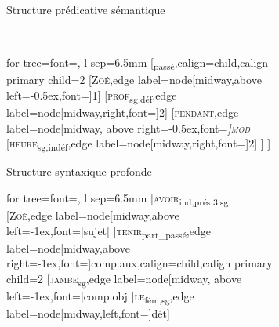 \begin{figure}[ph]
\begin{subfigure}[h]{0.66\textwidth}
		\caption{Structure prédicative sémantique}
	\end{subfigure}%
	\bigskip\medskip\\%
	\begin{subfigure}[b]{0.5\textwidth}\centering
		\begin{forest} for tree={font=\normalfont, l sep=6.5mm}
			[\textsubscript{passé},calign=child,calign primary child=2
				[\textsc{Zoé},edge label={node[midway,above left=-0.5ex,font=\footnotesize]{1}}]
				[\textsc{prof}\textsubscript{sg,déf},edge label={node[midway,right,font=\footnotesize]{2}}]
				[\textsc{pendant},edge label={node[midway, above right=-0.5ex,font=\footnotesize\itshape]{\textsc{mod}}}
					[\textsc{heure}\textsubscript{sg,indéf},edge label={node[midway,right,font=\footnotesize]{2}}]
				]
			]
		\end{forest}
		\caption{Structure syntaxique profonde}
	\end{subfigure}%
	\hfill
	\begin{subfigure}[b]{0.5\textwidth}\centering
		\begin{forest} for tree={font=\normalfont, l sep=6.5mm}
			[\textsc{avoir}\textsubscript{ind,prés,3,sg}
				[\textsc{Zoé},edge label={node[midway,above left=-1ex,font=\footnotesize]{sujet}}]
				[\textsc{tenir}\textsubscript{part\_passé},edge label={node[midway,above right=-1ex,font=\footnotesize]{comp{\NoAutoSpacing :}aux}},calign=child,calign primary child=2
					[\textsc{jambe}\textsubscript{sg},edge label={node[midway, above left=-1ex,font=\footnotesize]{comp{\NoAutoSpacing :}obj}}
						[\textsc{le}\textsubscript{fém,sg},edge label={node[midway,left,font=\footnotesize]{dét}}]

\end{forest}
\end{subfigure}
\end{figure}
